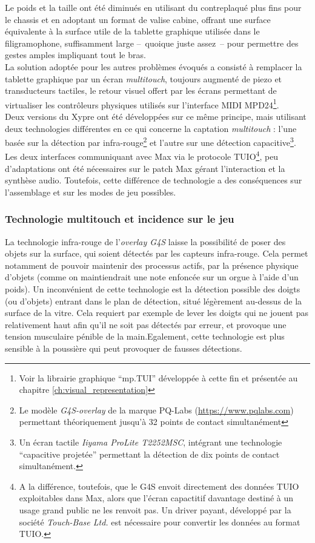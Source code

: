 \noindent Le poids et la taille ont été diminués en utilisant du contreplaqué plus fins pour le chassis et en adoptant un format de valise cabine, offrant une surface équivalente à la surface utile de la tablette graphique utilisée dans le filigramophone, suffisamment large --~quoique juste assez~-- pour permettre des gestes amples impliquant tout le bras.\\
\indent La solution adoptée pour les autres problèmes évoqués a consisté à remplacer la tablette graphique par un écran \textit{multitouch}, toujours augmenté de piezo et transducteurs tactiles, le retour visuel offert par les écrans permettant de virtualiser les contrôleurs physiques utilisés sur l'interface \gls{MIDI} MPD24\footnote{Voir la librairie graphique ``mp.TUI'' développée à cette fin et présentée au chapitre \ref{ch:visual_representation}}.\\
\indent Deux versions du Xypre ont été développées sur ce même principe, mais utilisant deux technologies différentes en ce qui concerne la captation \textit{multitouch} : l'une basée sur la détection par infra-rouge\footnote{Le modèle \textit{G4S-overlay} de la marque PQ-Labs (\url{https://www.pqlabs.com}) permettant théoriquement jusqu'à 32 points de contact simultanément} et l'autre sur une détection capacitive\footnote{Un écran tactile \textit{Iiyama ProLite T2252MSC}, intégrant une technologie ``capacitive projetée'' permettant la détection de dix points de contact simultanément.}. Les deux interfaces communiquant avec Max via le protocole \gls{TUIO}\footnote{A la différence, toutefois, que le G4S envoit directement des données \gls{TUIO} exploitables dans Max, alors que l'écran capactitif davantage destiné à un usage grand public ne les renvoit pas. Un driver payant, développé par la société \textit{Touch-Base Ltd.} est nécessaire pour convertir les données au format \gls{TUIO}.}, peu d'adaptations ont été nécessaires sur le patch Max gérant l'interaction et la synthèse audio. Toutefois, cette différence de technologie a des conséquences sur l'assemblage et sur les modes de jeu possibles. 

\subsubsection{Technologie multitouch et incidence sur le jeu}

\indent La technologie infra-rouge de l'\textit{overlay G4S} laisse la possibilité de poser des objets sur la surface, qui soient détectés par les capteurs infra-rouge. Cela permet notamment de pouvoir maintenir des processus actifs, par la présence physique d'objets (comme on maintiendrait une note enfoncée sur un orgue à l'aide d'un poids). Un inconvénient de cette technologie est la détection possible des doigts (ou d'objets) entrant dans le plan de détection, situé légèrement au-dessus de la surface de la vitre. Cela requiert par exemple de lever les doigts qui ne jouent pas relativement haut afin qu'il ne soit pas détectés par erreur, et provoque une tension musculaire pénible de la main.Egalement, cette technologie est plus sensible à la poussière qui peut provoquer de fausses détections.

